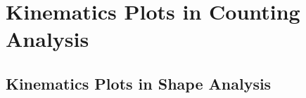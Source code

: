 


\section{Kinematics Plots in Counting Analysis}

\FloatBarrier



\subsection{Kinematics Plots in Shape Analysis}

\FloatBarrier

\FloatBarrier

\FloatBarrier

\FloatBarrier

\FloatBarrier

\FloatBarrier

\FloatBarrier
